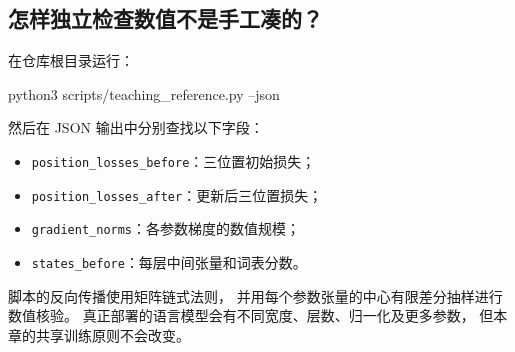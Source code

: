 \subsection{怎样独立检查数值不是手工凑的？}

在仓库根目录运行：
\begin{center}
\small\ttfamily
python3 scripts/teaching\_reference.py --json
\end{center}
然后在 JSON 输出中分别查找以下字段：
\begin{itemize}
\item \texttt{position\_losses\_before}：三位置初始损失；
\item \texttt{position\_losses\_after}：更新后三位置损失；
\item \texttt{gradient\_norms}：各参数梯度的数值规模；
\item \texttt{states\_before}：每层中间张量和词表分数。
\end{itemize}
脚本的反向传播使用矩阵链式法则，
并用每个参数张量的中心有限差分抽样进行数值核验。
真正部署的语言模型会有不同宽度、层数、归一化及更多参数，
但本章的共享训练原则不会改变。


